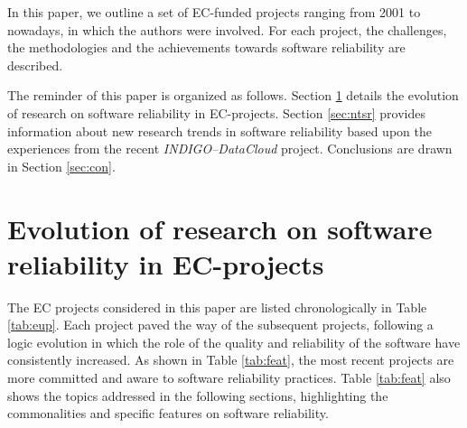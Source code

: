 \documentclass[journal]{IEEEtran}
\begin{document}
In this paper, we outline a set of EC-funded projects
ranging from 2001 to nowadays, in which the authors were involved.
For each project, the challenges, the methodologies and
the achievements towards software reliability are described.

The reminder of this paper is
organized as follows. Section \ref{sec:ev} details the evolution of research on
software reliability in EC-projects. Section \ref{sec:ntsr} provides
information about new research trends in software reliability based upon the
experiences from the recent {\sl INDIGO--DataCloud} project. Conclusions are drawn in Section \ref{sec:con}.

\section{Evolution of research on software reliability in EC-projects}
\label{sec:ev}

The EC projects considered in this paper are listed chronologically in Table
\ref{tab:eup}. Each project paved the way of the subsequent projects,
following a logic evolution in which the role of the quality and reliability of the software have
consistently increased. As shown in Table \ref{tab:feat}, the most recent projects are more committed and aware to software reliability practices.
Table \ref{tab:feat} also shows the topics addressed in the following sections, highlighting
the commonalities and specific features on software reliability.
\end{document}
